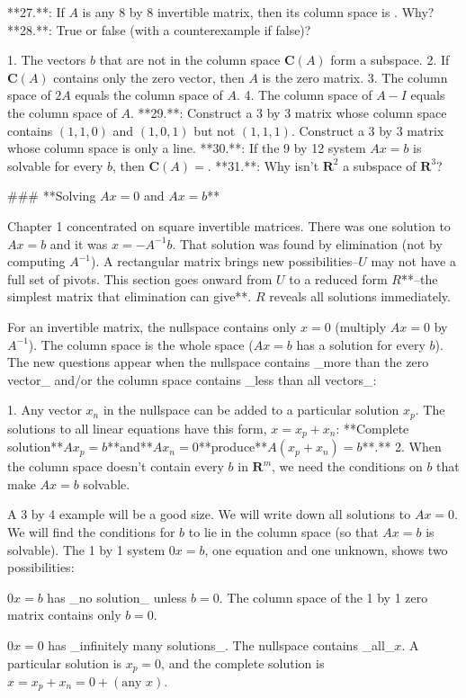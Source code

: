 

**27.**: If \(A\) is any 8 by 8 invertible matrix, then its column space is . Why?
**28.**: True or false (with a counterexample if false)?

1. The vectors \(b\) that are not in the column space \(\boldsymbol{C}(A)\) form a subspace.
2. If \(\boldsymbol{C}(A)\) contains only the zero vector, then \(A\) is the zero matrix.
3. The column space of \(2A\) equals the column space of \(A\).
4. The column space of \(A-I\) equals the column space of \(A\).
**29.**: Construct a 3 by 3 matrix whose column space contains \((1,1,0)\) and \((1,0,1)\) but not \((1,1,1)\). Construct a 3 by 3 matrix whose column space is only a line.
**30.**: If the 9 by 12 system \(Ax=b\) is solvable for every \(b\), then \(\boldsymbol{C}(A)=\).
**31.**: Why isn't \(\boldsymbol{R}^{2}\) a subspace of \(\boldsymbol{R}^{3}\)?

### **Solving \(Ax=0\) and \(Ax=b\)**

Chapter 1 concentrated on square invertible matrices. There was one solution to \(Ax=b\) and it was \(x=-A^{-1}b\). That solution was found by elimination (not by computing \(A^{-1}\)). A rectangular matrix brings new possibilities--\(U\) may not have a full set of pivots. This section goes onward from \(U\) to a reduced form \(R\)**--the simplest matrix that elimination can give**. \(R\) reveals all solutions immediately.

For an invertible matrix, the nullspace contains only \(x=0\) (multiply \(Ax=0\) by \(A^{-1}\)). The column space is the whole space (\(Ax=b\) has a solution for every \(b\)). The new questions appear when the nullspace contains _more than the zero vector_ and/or the column space contains _less than all vectors_:

1. Any vector \(x_{n}\) in the nullspace can be added to a particular solution \(x_{p}\). The solutions to all linear equations have this form, \(x=x_{p}+x_{n}\): **Complete solution**\(Ax_{p}=b\)**and**\(Ax_{n}=0\)**produce**\(A(x_{p}+x_{n})=b\)**.**
2. When the column space doesn't contain every \(b\) in \(\boldsymbol{R}^{m}\), we need the conditions on \(b\) that make \(Ax=b\) solvable.

A 3 by 4 example will be a good size. We will write down all solutions to \(Ax=0\). We will find the conditions for \(b\) to lie in the column space (so that \(Ax=b\) is solvable). The 1 by 1 system \(0x=b\), one equation and one unknown, shows two possibilities:

\(0x=b\) has _no solution_ unless \(b=0\). The column space of the 1 by 1 zero matrix contains only \(b=0\).

\(0x=0\) has _infinitely many solutions_. The nullspace contains _all_\(x\). A particular solution is \(x_{p}=0\), and the complete solution is \(x=x_{p}+x_{n}=0+(\text{any }x)\).

